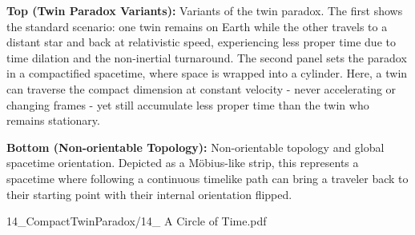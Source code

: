 \begin{SideNotePage}{
  \textbf{Top (Twin Paradox Variants):} Variants of the twin paradox. The first shows the standard scenario: one twin remains on Earth while the other travels to a distant star and back at relativistic speed, experiencing less proper time due to time dilation and the non-inertial turnaround. The second panel sets the paradox in a compactified spacetime, where space is wrapped into a cylinder. Here, a twin can traverse the compact dimension at constant velocity - never accelerating or changing frames - yet still accumulate less proper time than the twin who remains stationary. \par
  \textbf{Bottom (Non-orientable Topology):} Non-orientable topology and global spacetime orientation. Depicted as a Möbius-like strip, this represents a spacetime where following a continuous timelike path can bring a traveler back to their starting point with their internal orientation flipped.
}{14_CompactTwinParadox/14_ A Circle of Time.pdf}
\end{SideNotePage}
